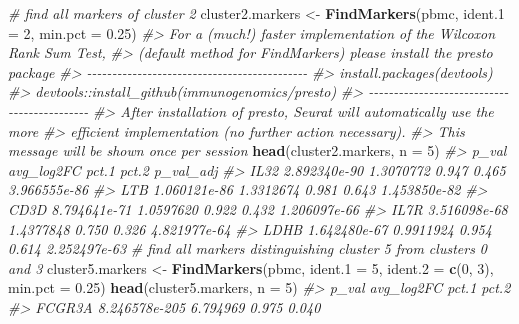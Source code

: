 \documentclass[
]{book}
\newenvironment{Shaded}{\begin{snugshade}}{\end{snugshade}}
\newcommand{\AttributeTok}[1]{\textcolor[rgb]{0.13,0.29,0.53}{#1}}
\newcommand{\CommentTok}[1]{\textcolor[rgb]{0.56,0.35,0.01}{\textit{#1}}}
\newcommand{\DecValTok}[1]{\textcolor[rgb]{0.00,0.00,0.81}{#1}}
\newcommand{\FloatTok}[1]{\textcolor[rgb]{0.00,0.00,0.81}{#1}}
\newcommand{\FunctionTok}[1]{\textcolor[rgb]{0.13,0.29,0.53}{\textbf{#1}}}
\newcommand{\NormalTok}[1]{#1}
\newcommand{\OtherTok}[1]{\textcolor[rgb]{0.56,0.35,0.01}{#1}}
\begin{document}
\begin{Shaded}
\begin{Highlighting}[]
\CommentTok{\# find all markers of cluster 2}
\NormalTok{cluster2.markers }\OtherTok{\textless{}{-}} \FunctionTok{FindMarkers}\NormalTok{(pbmc, }\AttributeTok{ident.1 =} \DecValTok{2}\NormalTok{, }\AttributeTok{min.pct =} \FloatTok{0.25}\NormalTok{)}
\CommentTok{\#\textgreater{} For a (much!) faster implementation of the Wilcoxon Rank Sum Test,}
\CommentTok{\#\textgreater{} (default method for FindMarkers) please install the presto package}
\CommentTok{\#\textgreater{} {-}{-}{-}{-}{-}{-}{-}{-}{-}{-}{-}{-}{-}{-}{-}{-}{-}{-}{-}{-}{-}{-}{-}{-}{-}{-}{-}{-}{-}{-}{-}{-}{-}{-}{-}{-}{-}{-}{-}{-}{-}{-}{-}{-}}
\CommentTok{\#\textgreater{} install.packages(\textquotesingle{}devtools\textquotesingle{})}
\CommentTok{\#\textgreater{} devtools::install\_github(\textquotesingle{}immunogenomics/presto\textquotesingle{})}
\CommentTok{\#\textgreater{} {-}{-}{-}{-}{-}{-}{-}{-}{-}{-}{-}{-}{-}{-}{-}{-}{-}{-}{-}{-}{-}{-}{-}{-}{-}{-}{-}{-}{-}{-}{-}{-}{-}{-}{-}{-}{-}{-}{-}{-}{-}{-}{-}{-}}
\CommentTok{\#\textgreater{} After installation of presto, Seurat will automatically use the more }
\CommentTok{\#\textgreater{} efficient implementation (no further action necessary).}
\CommentTok{\#\textgreater{} This message will be shown once per session}
\FunctionTok{head}\NormalTok{(cluster2.markers, }\AttributeTok{n =} \DecValTok{5}\NormalTok{)}
\CommentTok{\#\textgreater{}             p\_val avg\_log2FC pct.1 pct.2    p\_val\_adj}
\CommentTok{\#\textgreater{} IL32 2.892340e{-}90  1.3070772 0.947 0.465 3.966555e{-}86}
\CommentTok{\#\textgreater{} LTB  1.060121e{-}86  1.3312674 0.981 0.643 1.453850e{-}82}
\CommentTok{\#\textgreater{} CD3D 8.794641e{-}71  1.0597620 0.922 0.432 1.206097e{-}66}
\CommentTok{\#\textgreater{} IL7R 3.516098e{-}68  1.4377848 0.750 0.326 4.821977e{-}64}
\CommentTok{\#\textgreater{} LDHB 1.642480e{-}67  0.9911924 0.954 0.614 2.252497e{-}63}
\CommentTok{\# find all markers distinguishing cluster 5 from clusters 0 and 3}
\NormalTok{cluster5.markers }\OtherTok{\textless{}{-}} \FunctionTok{FindMarkers}\NormalTok{(pbmc, }\AttributeTok{ident.1 =} \DecValTok{5}\NormalTok{, }\AttributeTok{ident.2 =} \FunctionTok{c}\NormalTok{(}\DecValTok{0}\NormalTok{, }\DecValTok{3}\NormalTok{), }\AttributeTok{min.pct =} \FloatTok{0.25}\NormalTok{)}
\FunctionTok{head}\NormalTok{(cluster5.markers, }\AttributeTok{n =} \DecValTok{5}\NormalTok{)}
\CommentTok{\#\textgreater{}                       p\_val avg\_log2FC pct.1 pct.2}
\CommentTok{\#\textgreater{} FCGR3A        8.246578e{-}205   6.794969 0.975 0.040}

\end{Highlighting}
\end{Shaded}
\end{document}
